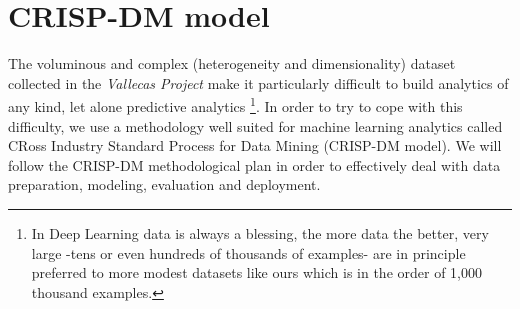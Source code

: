 \documentclass[11pt]{article}
\theoremstyle{definition}
\theoremstyle{remark}
\begin{document}
\section{CRISP-DM model}
\label{se:crisp}

 The voluminous and complex (heterogeneity and dimensionality) dataset collected in the \emph{Vallecas Project} make it particularly difficult to build analytics of any kind, let alone predictive analytics \footnote{In Deep Learning data is always a blessing, the more data the better, very large -tens or even hundreds of thousands of examples- are in principle preferred to more modest datasets like ours which is in the order of 1,000 thousand examples.}. In order to try to cope with this difficulty, we use a methodology well suited for machine learning analytics called CRoss Industry Standard Process for Data Mining (CRISP-DM model). We will follow the CRISP-DM methodological plan in order to effectively deal with data preparation, modeling, evaluation and deployment.
  
\end{document}
